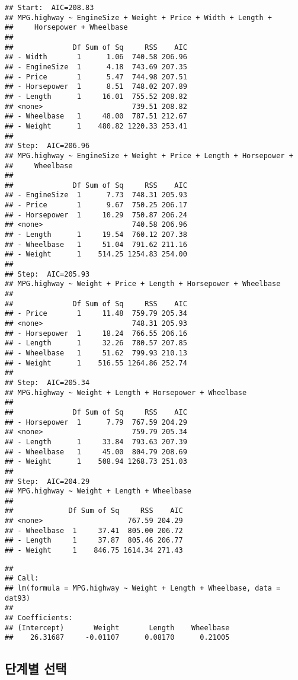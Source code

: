 \documentclass[
]{book}
\begin{document}
\begin{verbatim}
## Start:  AIC=208.83
## MPG.highway ~ EngineSize + Weight + Price + Width + Length + 
##     Horsepower + Wheelbase
## 
##              Df Sum of Sq     RSS    AIC
## - Width       1      1.06  740.58 206.96
## - EngineSize  1      4.18  743.69 207.35
## - Price       1      5.47  744.98 207.51
## - Horsepower  1      8.51  748.02 207.89
## - Length      1     16.01  755.52 208.82
## <none>                     739.51 208.82
## - Wheelbase   1     48.00  787.51 212.67
## - Weight      1    480.82 1220.33 253.41
## 
## Step:  AIC=206.96
## MPG.highway ~ EngineSize + Weight + Price + Length + Horsepower + 
##     Wheelbase
## 
##              Df Sum of Sq     RSS    AIC
## - EngineSize  1      7.73  748.31 205.93
## - Price       1      9.67  750.25 206.17
## - Horsepower  1     10.29  750.87 206.24
## <none>                     740.58 206.96
## - Length      1     19.54  760.12 207.38
## - Wheelbase   1     51.04  791.62 211.16
## - Weight      1    514.25 1254.83 254.00
## 
## Step:  AIC=205.93
## MPG.highway ~ Weight + Price + Length + Horsepower + Wheelbase
## 
##              Df Sum of Sq     RSS    AIC
## - Price       1     11.48  759.79 205.34
## <none>                     748.31 205.93
## - Horsepower  1     18.24  766.55 206.16
## - Length      1     32.26  780.57 207.85
## - Wheelbase   1     51.62  799.93 210.13
## - Weight      1    516.55 1264.86 252.74
## 
## Step:  AIC=205.34
## MPG.highway ~ Weight + Length + Horsepower + Wheelbase
## 
##              Df Sum of Sq     RSS    AIC
## - Horsepower  1      7.79  767.59 204.29
## <none>                     759.79 205.34
## - Length      1     33.84  793.63 207.39
## - Wheelbase   1     45.00  804.79 208.69
## - Weight      1    508.94 1268.73 251.03
## 
## Step:  AIC=204.29
## MPG.highway ~ Weight + Length + Wheelbase
## 
##             Df Sum of Sq     RSS    AIC
## <none>                    767.59 204.29
## - Wheelbase  1     37.41  805.00 206.72
## - Length     1     37.87  805.46 206.77
## - Weight     1    846.75 1614.34 271.43
\end{verbatim}

\begin{verbatim}
## 
## Call:
## lm(formula = MPG.highway ~ Weight + Length + Wheelbase, data = dat93)
## 
## Coefficients:
## (Intercept)       Weight       Length    Wheelbase  
##    26.31687     -0.01107      0.08170      0.21005
\end{verbatim}

\hypertarget{uxb2e8uxacc4uxbcc4-uxc120uxd0dd-1}{%
\subsection{단계별 선택}\label{uxb2e8uxacc4uxbcc4-uxc120uxd0dd-1}}
\end{document}
